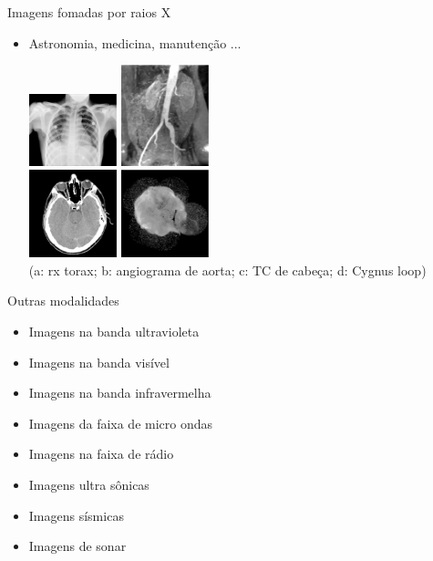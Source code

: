    \begin{slide}[toc=]{Imagens fomadas por raios X}
      \begin{itemize}
         \item Astronomia, medicina, manutenção ...
         \begin{center}
         \includegraphics[width=0.2\textwidth]{figs/Fig0107a}
         \includegraphics[width=0.2\textwidth]{figs/Fig0107b}\\
         \includegraphics[width=0.2\textwidth]{figs/Fig0107c}
         \includegraphics[width=0.2\textwidth]{figs/Fig0107e}\\
         \tiny{(a: rx torax; b: angiograma de aorta; c: TC de cabeça; d: Cygnus loop)}
         \end{center}
      \end{itemize}
   \end{slide}

   \begin{slide}[toc=]{Outras modalidades}
      \begin{itemize}
         \item Imagens na banda ultravioleta
         \item Imagens na banda visível
         \item Imagens na banda infravermelha
         \item Imagens da faixa de micro ondas
         \item Imagens na faixa de rádio
         \item Imagens ultra sônicas
         \item Imagens sísmicas
         \item Imagens de sonar
      \end{itemize}
   \end{slide}


